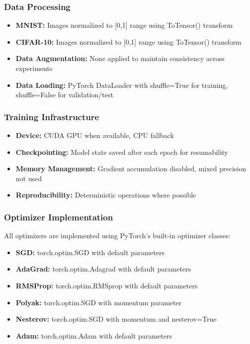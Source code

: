 \documentclass[12pt]{article}
\begin{document}
\subsubsection{Data Processing}
\begin{itemize}
    \item \textbf{MNIST:} Images normalized to [0,1] range using ToTensor() transform
    \item \textbf{CIFAR-10:} Images normalized to [0,1] range using ToTensor() transform
    \item \textbf{Data Augmentation:} None applied to maintain consistency across experiments
    \item \textbf{Data Loading:} PyTorch DataLoader with shuffle=True for training, shuffle=False for validation/test
\end{itemize}

\subsubsection{Training Infrastructure}
\begin{itemize}
    \item \textbf{Device:} CUDA GPU when available, CPU fallback
    \item \textbf{Checkpointing:} Model state saved after each epoch for resumability
    \item \textbf{Memory Management:} Gradient accumulation disabled, mixed precision not used
    \item \textbf{Reproducibility:} Deterministic operations where possible
\end{itemize}

\subsubsection{Optimizer Implementation}
All optimizers are implemented using PyTorch's built-in optimizer classes:
\begin{itemize}
    \item \textbf{SGD:} torch.optim.SGD with default parameters
    \item \textbf{AdaGrad:} torch.optim.Adagrad with default parameters
    \item \textbf{RMSProp:} torch.optim.RMSprop with default parameters
    \item \textbf{Polyak:} torch.optim.SGD with momentum parameter
    \item \textbf{Nesterov:} torch.optim.SGD with momentum and nesterov=True
    \item \textbf{Adam:} torch.optim.Adam with default parameters
\end{itemize}
\end{document}
